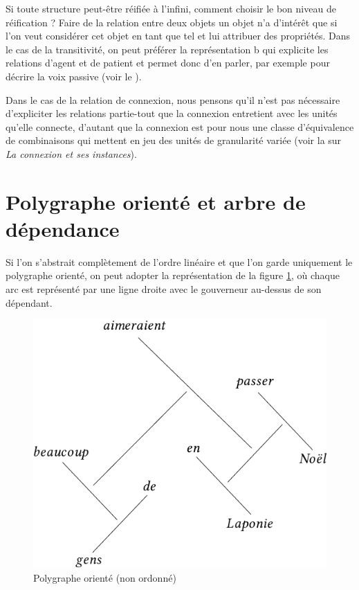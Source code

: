 {    Si toute structure peut-être réifiée à l’infini, comment choisir le bon niveau de réification ? Faire de la relation entre deux objets un objet n’a d’intérêt que si l’on veut considérer cet objet en tant que tel et lui attribuer des propriétés. Dans le cas de la transitivité, on peut préférer la représentation b qui explicite les relations d’agent et de patient et permet donc d’en parler, par exemple pour décrire la voix passive (voir le ).

    Dans le cas de la relation de connexion, nous pensons qu’il n’est pas nécessaire d’expliciter les relations partie-tout que la connexion entretient avec les unités qu’elle connecte, d'autant que la connexion est pour nous une classe d'équivalence de combinaisons qui mettent en jeu des unités de granularité variée (voir la  sur \textit{La connexion et ses instances}).}

\section{Polygraphe orienté et arbre de dépendance}\label{sec:3.4.23}

Si l’on s’abstrait complètement de l’ordre linéaire et que l’on garde uniquement le polygraphe orienté, on peut adopter la représentation de la figure \ref{fig:laponie-polygraphe-pur}, où chaque arc est représenté par une ligne droite avec le gouverneur au-dessus de son dépendant.

\begin{figure}
\caption{\label{fig:laponie-polygraphe-pur}Polygraphe orienté (non ordonné)}
\includegraphics[scale=0.9]{figures/polygraphs/poly-3.4.23-1.pdf}
\end{figure}

